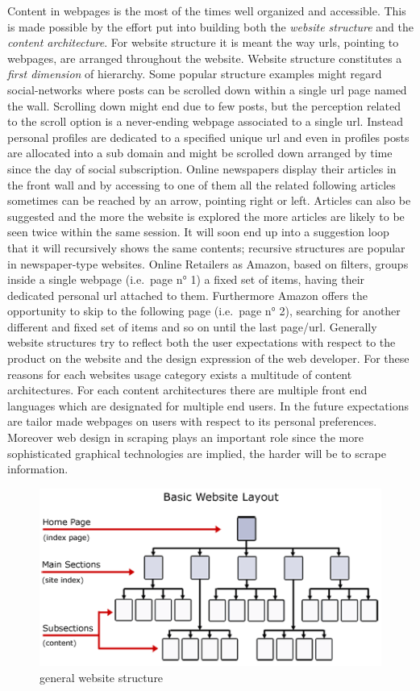 \documentclass[
  12pt,
  a4paper,
  oneside]{book}
\theoremstyle{definition}
\theoremstyle{definition}
\theoremstyle{definition}
\theoremstyle{remark}
\begin{document}
Content in webpages is the most of the times well organized and accessible.
This is made possible by the effort put into building both the \emph{website structure} and the \emph{content architecture}. For website structure it is meant the way urls, pointing to webpages, are arranged throughout the website.
Website structure constitutes a \emph{first dimension} of hierarchy. Some popular structure examples might regard social-networks where posts can be scrolled down within a single url page named the wall. Scrolling down might end due to few posts, but the perception related to the scroll option is a never-ending webpage associated to a single url. Instead personal profiles are dedicated to a specified unique url and even in profiles posts are allocated into a sub domain and might be scrolled down arranged by time since the day of social subscription. Online newspapers display their articles in the front wall and by accessing to one of them all the related following articles sometimes can be reached by an arrow, pointing right or left. Articles can also be suggested and the more the website is explored the more articles are likely to be seen twice within the same session. It will soon end up into a suggestion loop that it will recursively shows the same contents; recursive structures are popular in newspaper-type websites. Online Retailers as Amazon, based on filters, groups inside a single webpage (i.e.~page n° 1) a fixed set of items, having their dedicated personal url attached to them. Furthermore Amazon offers the opportunity to skip to the following page (i.e.~page n° 2), searching for another different and fixed set of items and so on until the last page/url. Generally website structures try to reflect both the user expectations with respect to the product on the website and the design expression of the web developer. For these reasons for each websites usage category exists a multitude of content architectures. For each content architectures there are multiple front end languages which are designated for multiple end users. In the future expectations are tailor made webpages on users with respect to its personal preferences. Moreover web design in scraping plays an important role since the more sophisticated graphical technologies are implied, the harder will be to scrape information.

\begin{figure}
\centering
\includegraphics{images/content-vs-html-title.png}
\caption{general website structure}
\end{figure}
\end{document}
